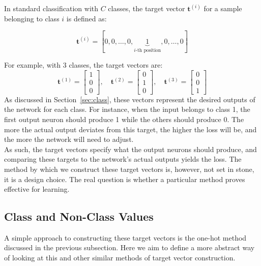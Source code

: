 \documentclass[12pt,fleqn,a4paper]{article}
\begin{document}
In standard classification with $C$ classes, the target vector $\mathbf{t}^{(i)}$ for a sample belonging to class $i$ is defined as:

$$\mathbf{t}^{(i)} = [0, 0, \ldots, 0, \underbrace{1}_{i\text{-th position}}, 0, \ldots, 0]$$

For example, with 3 classes, the target vectors are:
$$\mathbf{t}^{(1)} = \begin{bmatrix} 1 \\ 0 \\ 0 \end{bmatrix}, \quad 
\mathbf{t}^{(2)} = \begin{bmatrix} 0 \\ 1 \\ 0 \end{bmatrix}, \quad 
\mathbf{t}^{(3)} = \begin{bmatrix} 0 \\ 0 \\ 1 \end{bmatrix}$$
As discussed in Section~\ref{sec:class}, these vectors represent the desired outputs of the network for each class. For instance, when the input belongs to class 1, the first output neuron should produce 1 while the others should produce 0. The more the actual output deviates from this target, the higher the loss will be, and the more the network will need to adjust.\\ 

As such, the target vectors specify what the output neurons should produce, and comparing these targets to the network's actual outputs yields the loss.  The method by which we construct these target vectors is, however,  not set in stone, it is a design choice. The real question is whether a particular method proves effective for learning.

\subsection{Class and Non-Class Values}\label{sec:candnc}
A simple approach to constructing these target vectors is the one-hot method discussed in the previous subsection. Here we aim to define a more abstract way of looking at this and other similar methods of target vector construction. 
\end{document}
